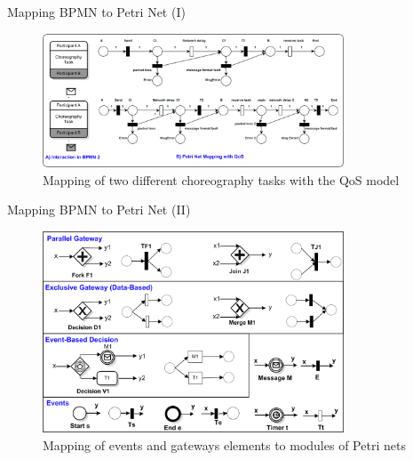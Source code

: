 \documentclass[xcolor=svgnames]{beamer}
\begin{document}
  \begin{frame}{Mapping BPMN to Petri Net (I)}
    \begin{figure}[!h]
      \centering
      \includegraphics[width=0.8\textwidth]{BPMNChoreographies1-QoS1.png}
      \caption{  Mapping of two different choreography tasks with the QoS model}      
    \end{figure}   
  \end{frame}


  \begin{frame}{Mapping BPMN to Petri Net (II)}
    \begin{figure}[!h]
	\centering
	\includegraphics[width=0.8\textwidth]{BPMNChoreographies2_2.png}
	\caption{Mapping of events and gateways elements to modules of Petri nets}
     \end{figure}   
  \end{frame}
\end{document}
